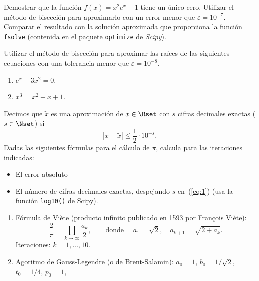 \documentclass[11pt]{article}
\begin{document}

\begin{problemas}
  \begin{problema}
    Demostrar que la función $f(x)=x^2e^{x}-1$ tiene un único
    cero. Utilizar el método de bisección para aproximarlo con un
    error menor que $\varepsilon=10^{-7}$. Comparar el resultado con
    la solución aproximada que proporciona la función \texttt{fsolve}
    (contenida en el paquete \texttt{optimize} de \textit{Scipy}).
  \end{problema}
  \begin{problema}
    Utilizar el método de bisección para aproximar las raíces de las
    siguientes ecuaciones con una tolerancia menor que
    $\varepsilon=10^{-8}$.
    \begin{enumerate}
    \item $e^x-3x^2=0$.
    \item $x^3=x^2+x+1$.
    \end{enumerate}
  \end{problema}
 \begin{problema}
    Decimos que $\widetilde x$ es una aproximación de $x\in\Rset$ con
    $s$ cifras decimales exactas ($s\in\Nset$) si
    \begin{equation}
    \label{eq:1}  |x-\widetilde x| \le \frac 12 \cdot 10^{-s}.
    \end{equation}
    Dadas las siguientes fórmulas para el cálculo de $\pi$, calcula
    para las iteraciones indicadas: 
    \begin{itemize}
    \item El error absoluto
    \item El número de cifras decimales exactas, despejando $s$
      en~(\ref{eq:1}) (usa la
      función \texttt{log10()} de Scipy).
    \end{itemize}
    \begin{enumerate}
    \item Fórmula de Viète (producto infinito publicado en 1593 por
      François Viète):
      \begin{equation*}
        \frac{2}{\pi}  = \prod_{k\to\infty} \frac{a_k}2, \qquad\text{donde }\quad
        a_1 = \sqrt{2}, \quad a_{k+1} = \sqrt{2+a_k}.
      \end{equation*}
      Iteraciones: $k=1,...,10$.
    \item Agoritmo de Gauss-Legendre (o de Brent-Salamin): $a_0=1$,
      $b_0=1/\sqrt 2$, $t_0=1/4$, $p_0=1$, 
    \begin{align*}

\end{align*}
\end{enumerate}
\end{problema}
\end{problemas}
\end{document}
